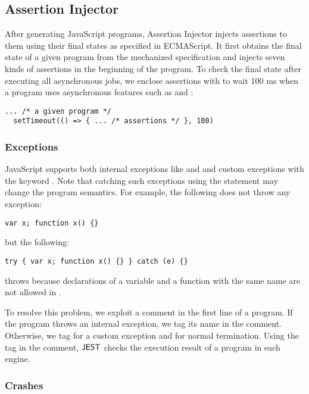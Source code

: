 \subsection{Assertion Injector}

After generating JavaScript programs, \textsf{Assertion Injector} injects
assertions to them using their final states as specified in ECMAScript.
It first obtains the final state of a given program from the
mechanized specification and injects seven kinds of assertions in the beginning of the program.
To check the final state after executing all asynchronous jobs,
we enclose assertions with  to wait 100 ms when a
program uses asynchronous features such as  and :
\begin{lstlisting}[style=myJSstyle]
  ... /* a given program */
  setTimeout(() => { ... /* assertions */ }, 100)
\end{lstlisting}


\subsubsection{Exceptions}

JavaScript supports both internal exceptions like  and
 and custom exceptions with the keyword .
Note that catching such exceptions using the  statement
may change the program semantics.  For example, the following does not throw any exception:
\begin{lstlisting}[style=myJSstyle]
    var x; function x() {}
\end{lstlisting}
but the following:
\begin{lstlisting}[style=myJSstyle]
    try { var x; function x() {} } catch (e) {}
\end{lstlisting}
throws  because declarations of a variable and a function
with the same name are not allowed in .

To resolve this problem, we exploit a comment in the first line of a program.
If the program throws an internal exception, we tag its name in the comment.
Otherwise, we tag  for a custom exception and  for
normal termination.  Using the tag in the comment, $\text{\sf JEST}$ checks the
execution result of a program in each engine.


\subsubsection{Crashes}

